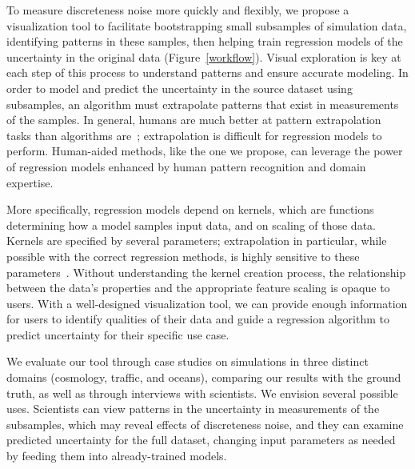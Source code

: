 To measure discreteness noise more quickly and flexibly, we propose a visualization tool to facilitate bootstrapping small subsamples of simulation data, identifying patterns in these samples, then helping train regression models of the uncertainty in the original data (Figure~\ref{workflow}). Visual exploration is key at each step of this process to understand patterns and ensure accurate modeling. In order to model and predict the uncertainty in the source dataset using subsamples, an algorithm must extrapolate patterns that exist in measurements of the samples. In general, humans are much better at pattern extrapolation tasks than algorithms are~\cite{HumanKernel}; extrapolation is difficult for regression models to perform. Human-aided methods, like the one we propose, can leverage the power of regression models enhanced by human pattern recognition and domain expertise.

More specifically, regression models depend on kernels, which are functions determining how a model samples input data, and on scaling of those data. Kernels are specified by several parameters; extrapolation in particular, while possible with the correct regression methods, is highly sensitive to these parameters~\cite{WilsonGCN14}. Without understanding the kernel creation process, the relationship between the data's properties and the appropriate feature scaling is opaque to users. With a well-designed visualization tool, we can provide enough information for users to identify qualities of their data and guide a regression algorithm to predict uncertainty for their specific use case.

We evaluate our tool through case studies on simulations in three distinct domains (cosmology, traffic, and oceans), comparing our results with the ground truth, as well as through interviews with scientists. We envision several possible uses. Scientists can view patterns in the uncertainty in measurements of the subsamples, which may reveal effects of discreteness noise, and they can examine predicted uncertainty for the full dataset, changing input parameters as needed by feeding them into already-trained models.

